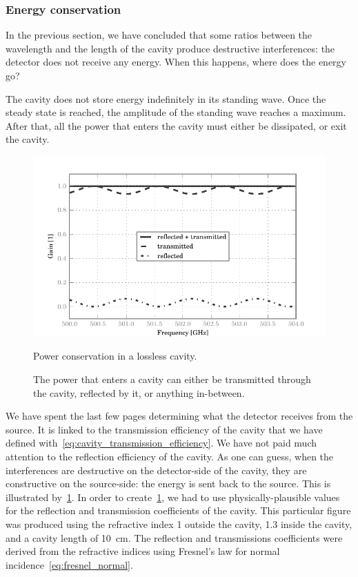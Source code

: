 \subsubsection{Energy conservation}
In the previous section, we have concluded that some ratios between the wavelength and the length of the cavity produce destructive interferences: the detector does not receive any energy.
When this happens, where does the energy go?

The cavity does not store energy indefinitely in its standing wave.
Once the steady state is reached, the amplitude of the standing wave reaches a maximum.
After that, all the power that enters the cavity must either be dissipated, or exit the cavity.

\begin{figure}[hbtp]
    \centering
    \includegraphics{cavity_energy_conservation}
    \caption{Power conservation in a lossless cavity.}
    \caption*{
        The power that enters a cavity can either be transmitted through the cavity, reflected by it, or anything in-between.
    }
    \label{fig:cavity_energy_conservation}
\end{figure}
We have spent the last few pages determining what the detector receives from the source.
It is linked to the transmission efficiency of the cavity that we have defined with~\cref{eq:cavity_transmission_efficiency}.
We have not paid much attention to the reflection efficiency of the cavity.
As one can guess, when the interferences are destructive on the detector-side of the cavity, they are constructive on the source-side: the energy is sent back to the source.
This is illustrated by~\cref{fig:cavity_energy_conservation}.
In order to create~\cref{fig:cavity_energy_conservation}, we had to use physically-plausible values for the reflection and transmission coefficients of the cavity.
This particular figure was produced using the refractive index \num{1} outside the cavity, \num{1.3} inside the cavity, and a cavity length of \SI{10}{\centi\meter}.
The reflection and transmissions coefficients were derived from the refractive indices using Fresnel's law for normal incidence~\eqref{eq:fresnel_normal}.


